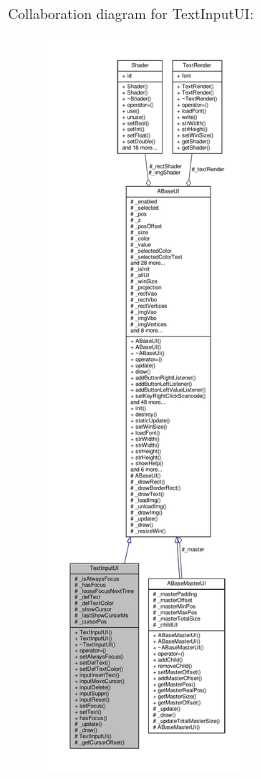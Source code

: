 Collaboration diagram for Text\+Input\+UI\+:
\nopagebreak
\begin{figure}[H]
\begin{center}
\leavevmode
\includegraphics[height=550pt]{class_text_input_u_i__coll__graph}
\end{center}
\end{figure}
